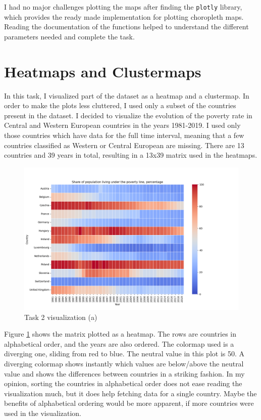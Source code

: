 \documentclass[11pt,a4paper,titlepage]{article}
\begin{document}
I had no major challenges plotting the maps after finding the \texttt{plotly} library, which provides the ready made implementation for plotting choropleth maps. Reading the documentation of the functions helped to understand the different parameters needed and complete the task.

\section{Heatmaps and Clustermaps}

In this task, I visualized part of the dataset as a heatmap and a clustermap. In order to make the plots less cluttered, I used only a subset of the countries present in the dataset. I decided to visualize the evolution of the poverty rate in Central and Western European countries in the years 1981-2019. I used only those countries which have data for the full time interval, meaning that a few countries classified as Western or Central European are missing. There are 13 countries and 39 years in total, resulting in a 13x39 matrix used in the heatmaps.

\begin{figure}[h]
    \centering
    \includegraphics[width=1.0\linewidth]{reports/assignment-3/imgs/task2-1.png}
    \caption{Task 2 visualization (a)}
    \label{fig:viz3}
\end{figure}

Figure \ref{fig:viz3} shows the matrix plotted as a heatmap. The rows are countries in alphabetical order, and the years are also ordered. The colormap used is a diverging one, sliding from red to blue. The neutral value in this plot is 50. A diverging colormap shows instantly which values are below/above the neutral value and shows the differences between countries in a striking fashion. In my opinion, sorting the countries in alphabetical order does not ease reading the visualization much, but it does help fetching data for a single country. Maybe the benefits of alphabetical ordering would be more apparent, if more countries were used in the visualization.
\end{document}
